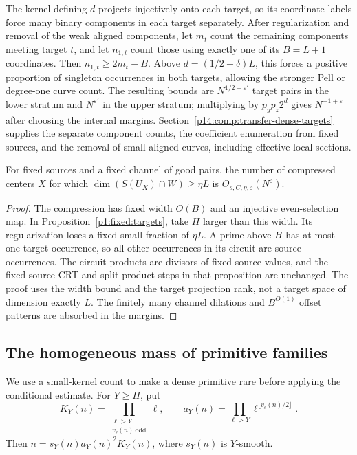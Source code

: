 The kernel defining $d$ projects injectively onto each target, so its
coordinate labels force many binary components in each target separately.
After regularization and removal of the weak aligned components, let
$m_t$ count the remaining components meeting target $t$, and let $n_{1,t}$
count those using exactly one of its $B=L+1$ coordinates. Then
$n_{1,t}\geq2m_t-B$. Above $d=(1/2+\delta)L$, this forces a positive
proportion of singleton occurrences in both targets, allowing the stronger
Pell or degree-one curve count. The resulting bounds are
$N^{1/2+\varepsilon'}$ target pairs in the lower stratum and
$N^{\varepsilon'}$ in the upper stratum; multiplying by $p_yp_z2^d$
gives $N^{-1+\varepsilon}$ after choosing the internal margins.
Section~\ref{p14:comp:transfer-dense-targets} supplies the separate
component counts, the coefficient enumeration from fixed sources, and
the removal of small aligned curves, including effective local sections.


\begin{lemma}
\label{p13:transfer:compressed-target}
For fixed sources and a fixed channel of good pairs, the number of
compressed centers $X$ for which
$\dim(S(U_X)\cap W)\geq\eta L$ is $O_{s,C,\eta,\varepsilon}(N^\varepsilon)$.
\end{lemma}

\begin{proof}
The compression has fixed width $O(B)$ and an injective even-selection
map. In Proposition~\ref{p1:fixed:targets}, take $H$ larger than this
width. Its regularization loses a fixed small fraction of $\eta L$.
A prime above $H$ has at most one target occurrence, so all other
occurrences in its circuit are source occurrences. The circuit products
are divisors of fixed source values, and the fixed-source CRT and
split-product steps in that proposition are unchanged. The proof uses
the width bound and the target projection rank, not a target space of
dimension exactly $L$. The finitely many channel dilations and
$B^{O(1)}$ offset patterns are absorbed in the margins.
\end{proof}

\subsection{The homogeneous mass of primitive families}

We use a small-kernel count to make a dense primitive rare before applying
the conditional estimate. For $Y\geq H$, put
\[
 K_Y(n)=\prod_{\substack{\ell>Y\\v_\ell(n)\ \mathrm{odd}}}\ell,\qquad
 a_Y(n)=\prod_{\ell>Y}\ell^{\lfloor v_\ell(n)/2\rfloor}.
\]
Then $n=s_Y(n)a_Y(n)^2K_Y(n)$, where $s_Y(n)$ is $Y$-smooth.


